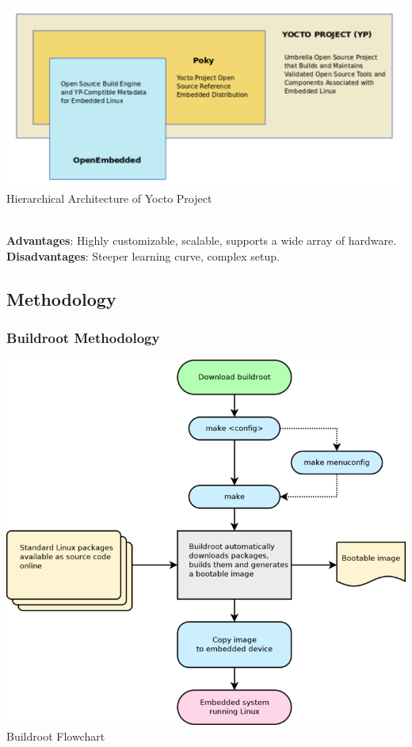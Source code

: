     \includegraphics[width=1\linewidth]{Images/9_Linux_image/Poky and Yocto.png}
      \centering
    Hierarchical Architecture of Yocto Project 
    \label{fig:enter-label}
\\
\raggedright
\noindent \\
\textbf{Advantages}: Highly customizable, scalable, supports a wide array of hardware.\\
\textbf{Disadvantages}: Steeper learning curve, complex setup.\\


\subsection{Methodology}

\subsubsection{Buildroot Methodology}

 
    \includegraphics[width=1\linewidth]{Images/9_Linux_image/Buildroot Flowchart.png}
      \centering
    Buildroot Flowchart
    \label{fig:enter-label}
\noindent
\\
\raggedright
